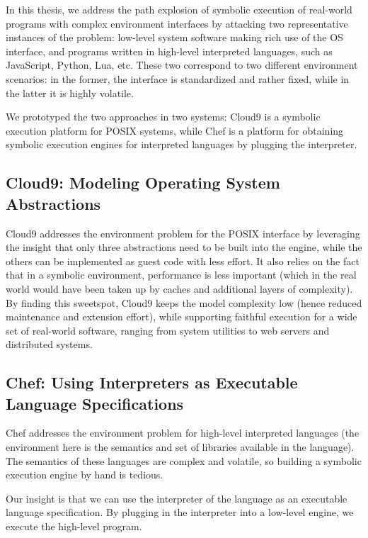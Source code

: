 In this thesis, we address the path explosion of symbolic execution of real-world programs with complex environment interfaces by attacking two representative instances of the problem: low-level system software making rich use of the OS interface, and programs written in high-level interpreted languages, such as JavaScript, Python, Lua, etc.  These two correspond to two different environment scenarios: in the former, the interface is standardized and rather fixed, while in the latter it is highly volatile.

We prototyped the two approaches in two systems: Cloud9 is a symbolic execution platform for POSIX systems, while Chef is a platform for obtaining symbolic execution engines for interpreted languages by plugging the interpreter.

\subsection{Cloud9: Modeling Operating System Abstractions}

Cloud9 addresses the environment problem for the POSIX interface by leveraging the insight that only three abstractions need to be built into the engine, while the others can be implemented as guest code with less effort.  It also relies on the fact that in a symbolic environment, performance is less important (which in the real world would have been taken up by caches and additional layers of complexity).  By finding this sweetspot, Cloud9 keeps the model complexity low (hence reduced maintenance and extension effort), while supporting faithful execution for a wide set of real-world software, ranging from system utilities to web servers and distributed systems.

\subsection{Chef: Using Interpreters as Executable Language Specifications}

Chef addresses the environment problem for high-level interpreted languages (the environment here is the semantics and set of libraries available in the language).  The semantics of these languages are complex and volatile, so building a symbolic execution engine by hand is tedious.

Our insight is that we can use the interpreter of the language as an executable language specification.  By plugging in the interpreter into a low-level engine, we execute the high-level program.


